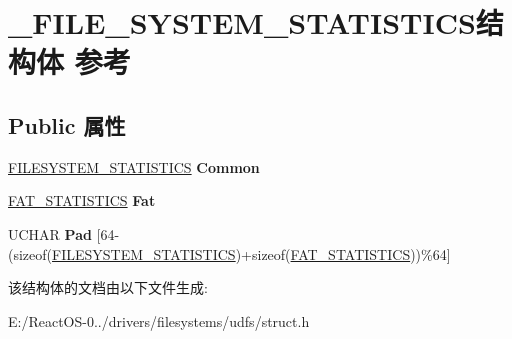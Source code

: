 \hypertarget{struct___f_i_l_e___s_y_s_t_e_m___s_t_a_t_i_s_t_i_c_s}{}\section{\+\_\+\+F\+I\+L\+E\+\_\+\+S\+Y\+S\+T\+E\+M\+\_\+\+S\+T\+A\+T\+I\+S\+T\+I\+C\+S结构体 参考}
\label{struct___f_i_l_e___s_y_s_t_e_m___s_t_a_t_i_s_t_i_c_s}
\subsection*{Public 属性}
\begin{DoxyCompactItemize}
\item 
\mbox{\label{struct___f_i_l_e___s_y_s_t_e_m___s_t_a_t_i_s_t_i_c_s_a031f72fca9fd4e9e64a439f5efbc7242}} 
\hyperlink{struct___f_i_l_e_s_y_s_t_e_m___s_t_a_t_i_s_t_i_c_s}{F\+I\+L\+E\+S\+Y\+S\+T\+E\+M\+\_\+\+S\+T\+A\+T\+I\+S\+T\+I\+CS} {\bfseries Common}
\item 
\mbox{\label{struct___f_i_l_e___s_y_s_t_e_m___s_t_a_t_i_s_t_i_c_s_a7767e7a992adae4ba21e417dbcd4a679}} 
\hyperlink{struct___f_a_t___s_t_a_t_i_s_t_i_c_s}{F\+A\+T\+\_\+\+S\+T\+A\+T\+I\+S\+T\+I\+CS} {\bfseries Fat}
\item 
\mbox{\label{struct___f_i_l_e___s_y_s_t_e_m___s_t_a_t_i_s_t_i_c_s_a443a72b40ec97ff1a88c2d68cb800be3}} 
U\+C\+H\+AR {\bfseries Pad} \mbox{[}64-\/(sizeof(\hyperlink{struct___f_i_l_e_s_y_s_t_e_m___s_t_a_t_i_s_t_i_c_s}{F\+I\+L\+E\+S\+Y\+S\+T\+E\+M\+\_\+\+S\+T\+A\+T\+I\+S\+T\+I\+CS})+sizeof(\hyperlink{struct___f_a_t___s_t_a_t_i_s_t_i_c_s}{F\+A\+T\+\_\+\+S\+T\+A\+T\+I\+S\+T\+I\+CS}))\%64\mbox{]}
\end{DoxyCompactItemize}


该结构体的文档由以下文件生成\+:\begin{DoxyCompactItemize}
\item 
E\+:/\+React\+O\+S-\/0../drivers/filesystems/udfs/struct.\+h\end{DoxyCompactItemize}
